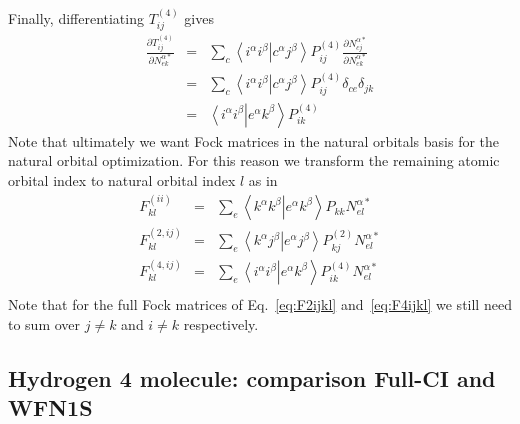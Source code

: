 \documentclass[pra]{revtex4-1}
\newcommand{\eria}[4]{\left\langle #1^\alpha #2^\beta \right.\left| #3^\alpha #4^\beta \right\rangle}
\begin{document}
Finally, differentiating $T^{(4)}_{ij}$ gives
\begin{eqnarray}
   \frac{\partial T^{(4)}_{ij}}{\partial N^{\alpha*}_{ek}}
   &=& \sum_c\eria{i}{i}{c}{j}P^{(4)}_{ij}
       \frac{\partial N^{\alpha*}_{cj}}{\partial N^{\alpha*}_{ek}} \\
   &=& \sum_c\eria{i}{i}{c}{j}P^{(4)}_{ij}\delta_{ce}\delta_{jk} \\
   &=& \eria{i}{i}{e}{k}P^{(4)}_{ik}
\end{eqnarray}
Note that ultimately we want Fock matrices in the natural orbitals basis
for the natural orbital optimization. For this reason we transform the remaining
atomic orbital index to natural orbital index $l$ as in
\begin{eqnarray}
   F^{(ii)}_{kl}
   &=& \sum_e\eria{k}{k}{e}{k}P_{kk}N^{\alpha*}_{el} \\
   F^{(2,ij)}_{kl}
   &=& \sum_e\eria{k}{j}{e}{j}P^{(2)}_{kj}N^{\alpha*}_{el}
       \label{eq:F2ijkl} \\
   F^{(4,ij)}_{kl}
   &=& \sum_e\eria{i}{i}{e}{k}P^{(4)}_{ik}N^{\alpha*}_{el}
       \label{eq:F4ijkl} \\
\end{eqnarray}
Note that for the full Fock matrices of Eq.~\ref{eq:F2ijkl} and~\ref{eq:F4ijkl}
we still need to sum over $j \ne k$ and $i \ne k$ respectively.






\subsection{Hydrogen 4 molecule: comparison Full-CI and WFN1S}
\end{document}
